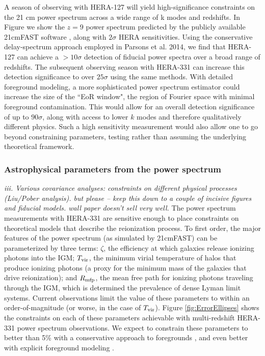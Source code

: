 \documentclass[preprint]{aastex}
\begin{document}
A season of observing with HERA-127 will yield high-significance constraints on the 21 cm power spectrum across a wide range of k modes and redshifts.  In Figure we show the $z=9$ power spectrum predicted by the publicly available 21cmFAST software \citep{mesinger_et_al2011}, along with $2\sigma$ HERA sensitivities.  Using the conservative delay-spectrum approach employed in Parsons et al. 2014, we find that HERA-127 can achieve a $> 10\sigma$ detection of fiducial power spectra over a broad range of redshifts.  The subsequent observing season with HERA-331 can increase this detection significance to over $25\sigma$ using the same methods.  With detailed foreground modeling, a more sophisticated power spectrum estimator could increase the size of the ``EoR window", the region of Fourier space with minimal foreground contamination. This would allow for an overall detection significance of up to $90\sigma$, along with access to lower $k$ modes and therefore qualitatively different physics.  Such a high sensitivity measurement would also allow one to go beyond constraining parameters, testing rather than assuming the underlying theoretical framework.

\subsubsection{Astrophysical parameters from the power spectrum}
\emph{iii. Various covariance analyses: constraints on different physical processes (Liu/Pober analysis). but
please -- keep this down to a couple of incisive figures and fiducial models. wall paper doesn't sell very well. }
The power spectrum measurements with HERA-331 are sensitive enough to place constraints on theoretical models that describe the reionization process.  To first order, the major features of the power spectrum (as simulated by 21cmFAST) can be parameterized by three terms: $\zeta$, the efficiency at which galaxies release ionizing photons into the IGM; $T_{\rm vir}$, the minimum virial temperature of halos that produce ionizing photons (a proxy for the minimum mass of the galaxies that drive reionization); and $R_{\rm mfp}$, the mean free path for ionizing photons traveling through the IGM, which is determined the prevalence of dense Lyman limit systems.  Current observations limit the value of these parameters to within an order-of-magnitude (or worse, in the case of $T_{\rm vir}$).  Figure \ref{fig:ErrorEllipses} shows the constraints on each of these parameters achievable with multi-redshift HERA-331 power spectrum observations.  We expect to constrain these parameters to better than 5\% with a conservative approach to foregrounds , and even better with explicit foreground modeling \citep{pober_et_al2014}.
\end{document}
